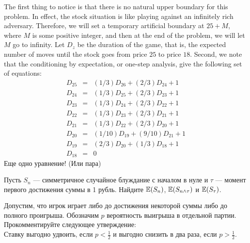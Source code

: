 \begin{solution} 

The first thing to notice is that there is no natural upper
boundary for this problem. In effect, the stock situation is
like playing against an infinitely rich adversary. Therefore,
we will set a temporary
artificial boundary at $25+M$, where $M$ is some
positive integer, and then at the end of the problem, we will
let $M$ go to infinity. Let $D_z$ be the duration of the game,
that is, the expected number of moves until the stock goes
from price $25$ to price $18$. Second, we note that the
conditioning by expectation, or one-step analysis, give the
following set of equations:
\begin{eqnarray*}
 D_{25} &=& (1/3) D_{26} + (2/3) D_{24} + 1  \\
 D_{24} &=& (1/3) D_{25} + (2/3) D_{23} + 1  \\
 D_{23} &=& (1/3) D_{24} + (2/3) D_{22} + 1  \\
 D_{22} &=& (1/3) D_{23} + (2/3) D_{21} + 1  \\
 D_{21} &=& (1/3) D_{22} + (2/3) D_{20} + 1  \\
 D_{20} &=& (1/10) D_{19} + (9/10) D_{21} + 1  \\
 D_{19} &=& (2/3) D_{20} + (1/3) D_{18} + 1  \\
 D_{18} &=& 0
\end{eqnarray*}
Еще одно уравнение! (Или пара)  
\end{solution}

\begin{problem}
Пусть $S_{n}$ --- симметричное случайное блуждание с началом в нуле
и $\tau$ --- момент первого достижения суммы в 1 рубль. Найдите
$\mathbb{E}(S_{n})$, $\mathbb{E}(S_{n\wedge \tau})$ и $\mathbb{E}(S_{\tau})$. 
\end{problem} 
\begin{solution} 

\end{solution}

\begin{problem}
Допустим, что игрок играет либо до достижения некоторой суммы либо
до полного проигрыша. Обозначим $p$ вероятность выигрыша в отдельной партии. \\
Прокомментируйте следующее утверждение: \\
Ставку выгодно удвоить, если $p<\frac{1}{2}$ и выгодно снизить в
два раза, если $p>\frac{1}{2}$. 
\end{problem} 
\begin{solution} 

\end{solution}


